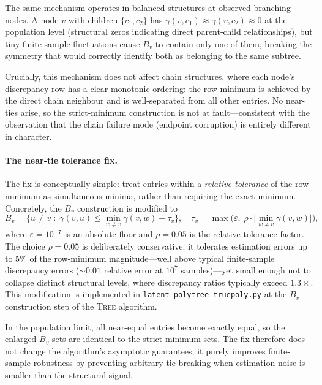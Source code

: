 \documentclass[11pt,a4paper]{article}
\numberwithin{equation}{section}
\begin{document}
The same mechanism operates in balanced structures at observed branching nodes.  A
node $v$ with children $\{c_1, c_2\}$ has $\gamma(v, c_1) \approx \gamma(v, c_2)
\approx 0$ at the population level (structural zeros indicating direct parent-child
relationships), but tiny finite-sample fluctuations cause $B_v$ to contain only one
of them, breaking the symmetry that would correctly identify both as belonging to the
same subtree.

Crucially, this mechanism does not affect chain structures, where each node's
discrepancy row has a clear monotonic ordering: the row minimum is achieved by the
direct chain neighbour and is well-separated from all other entries.  No near-ties
arise, so the strict-minimum construction is not at fault---consistent with the
observation that the chain failure mode (endpoint corruption) is entirely different
in character.

\paragraph{The near-tie tolerance fix.}
The fix is conceptually simple: treat entries within a \emph{relative tolerance} of the
row minimum as simultaneous minima, rather than requiring the exact minimum.
Concretely, the $B_v$ construction is modified to
\[
  B_v = \bigl\{ u \neq v \;:\; \gamma(v, u) \leq \min_{w \neq v} \gamma(v, w) +
  \tau_v \bigr\},
  \quad
  \tau_v = \max\!\bigl(\varepsilon,\; \rho \cdot \bigl|\min_{w \neq v}
  \gamma(v, w)\bigr|\bigr),
\]
where $\varepsilon = 10^{-7}$ is an absolute floor and $\rho = 0.05$ is the relative
tolerance factor.  The choice $\rho = 0.05$ is deliberately conservative: it
tolerates estimation errors up to 5\% of the row-minimum magnitude---well above
typical finite-sample discrepancy errors (${\sim}0.01$ relative error at $10^7$
samples)---yet small enough not to collapse distinct structural levels, where
discrepancy ratios typically exceed $1.3\times$.  This modification is implemented in
\texttt{latent\_polytree\_truepoly.py} at the $B_v$ construction step of the
\textsc{Tree} algorithm.

In the population limit, all near-equal entries become exactly equal, so the enlarged
$B_v$ sets are identical to the strict-minimum sets.  The fix therefore does not
change the algorithm's asymptotic guarantees; it purely improves finite-sample
robustness by preventing arbitrary tie-breaking when estimation noise is smaller than
the structural signal.
\end{document}

